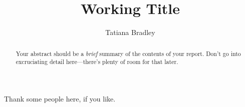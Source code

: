 \documentclass{scrippsthesis}
\title{Working Title}
\author{Tatiana Bradley}
\begin{document}
\frontmatter
\maketitle



\begin{abstract}
  Your abstract should be a \emph{brief} summary of the contents of
  your report.  Don't go into excruciating detail here---there's
  plenty of room for that later.
\end{abstract}

\tableofcontents


\begin{acknowledgments}
 Thank some people here, if you like.
\end{acknowledgments}


\mainmatter




\backmatter

{}

\end{document}
